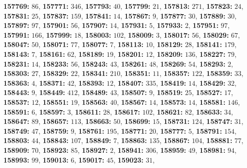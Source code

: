 \textsf{\bfseries 157769:} $86$, \textsf{\bfseries 157771:} $346$, \textsf{\bfseries 157793:} $40$, \textsf{\bfseries 157799:} $21$, \textsf{\bfseries 157813:} $271$, \textsf{\bfseries 157823:} $24$, \textsf{\bfseries 157831:} $25$, \textsf{\bfseries 157837:} $159$, \textsf{\bfseries 157841:} $14$, \textsf{\bfseries 157867:} $9$, \textsf{\bfseries 157877:} $30$, \textsf{\bfseries 157889:} $30$, \textsf{\bfseries 157897:} $97$, \textsf{\bfseries 157901:} $56$, \textsf{\bfseries 157907:} $14$, \textsf{\bfseries 157931:} $5$, \textsf{\bfseries 157933:} $2$, \textsf{\bfseries 157951:} $97$, \textsf{\bfseries 157991:} $166$, \textsf{\bfseries 157999:} $18$, \textsf{\bfseries 158003:} $102$, \textsf{\bfseries 158009:} $3$, \textsf{\bfseries 158017:} $56$, \textsf{\bfseries 158029:} $67$, \textsf{\bfseries 158047:} $50$, \textsf{\bfseries 158071:} $77$, \textsf{\bfseries 158077:} $7$, \textsf{\bfseries 158113:} $10$, \textsf{\bfseries 158129:} $28$, \textsf{\bfseries 158141:} $179$, \textsf{\bfseries 158143:} $7$, \textsf{\bfseries 158161:} $62$, \textsf{\bfseries 158189:} $19$, \textsf{\bfseries 158201:} $12$, \textsf{\bfseries 158209:} $136$, \textsf{\bfseries 158227:} $79$, \textsf{\bfseries 158231:} $14$, \textsf{\bfseries 158233:} $56$, \textsf{\bfseries 158243:} $43$, \textsf{\bfseries 158261:} $48$, \textsf{\bfseries 158269:} $54$, \textsf{\bfseries 158293:} $2$, \textsf{\bfseries 158303:} $27$, \textsf{\bfseries 158329:} $22$, \textsf{\bfseries 158341:} $210$, \textsf{\bfseries 158351:} $11$, \textsf{\bfseries 158357:} $122$, \textsf{\bfseries 158359:} $33$, \textsf{\bfseries 158363:} $4$, \textsf{\bfseries 158371:} $42$, \textsf{\bfseries 158393:} $12$, \textsf{\bfseries 158407:} $335$, \textsf{\bfseries 158419:} $14$, \textsf{\bfseries 158429:} $32$, \textsf{\bfseries 158443:} $9$, \textsf{\bfseries 158449:} $412$, \textsf{\bfseries 158489:} $43$, \textsf{\bfseries 158507:} $9$, \textsf{\bfseries 158519:} $25$, \textsf{\bfseries 158527:} $17$, \textsf{\bfseries 158537:} $12$, \textsf{\bfseries 158551:} $19$, \textsf{\bfseries 158563:} $40$, \textsf{\bfseries 158567:} $14$, \textsf{\bfseries 158573:} $14$, \textsf{\bfseries 158581:} $146$, \textsf{\bfseries 158591:} $6$, \textsf{\bfseries 158597:} $3$, \textsf{\bfseries 158611:} $28$, \textsf{\bfseries 158617:} $102$, \textsf{\bfseries 158621:} $82$, \textsf{\bfseries 158633:} $34$, \textsf{\bfseries 158647:} $89$, \textsf{\bfseries 158657:} $113$, \textsf{\bfseries 158663:} $50$, \textsf{\bfseries 158699:} $15$, \textsf{\bfseries 158731:} $124$, \textsf{\bfseries 158747:} $31$, \textsf{\bfseries 158749:} $47$, \textsf{\bfseries 158759:} $9$, \textsf{\bfseries 158761:} $195$, \textsf{\bfseries 158771:} $20$, \textsf{\bfseries 158777:} $5$, \textsf{\bfseries 158791:} $154$, \textsf{\bfseries 158803:} $44$, \textsf{\bfseries 158843:} $107$, \textsf{\bfseries 158849:} $7$, \textsf{\bfseries 158863:} $135$, \textsf{\bfseries 158867:} $104$, \textsf{\bfseries 158881:} $77$, \textsf{\bfseries 158909:} $70$, \textsf{\bfseries 158923:} $85$, \textsf{\bfseries 158927:} $2$, \textsf{\bfseries 158941:} $306$, \textsf{\bfseries 158959:} $49$, \textsf{\bfseries 158981:} $94$, \textsf{\bfseries 158993:} $99$, \textsf{\bfseries 159013:} $6$, \textsf{\bfseries 159017:} $45$, \textsf{\bfseries 159023:} $31$, 
